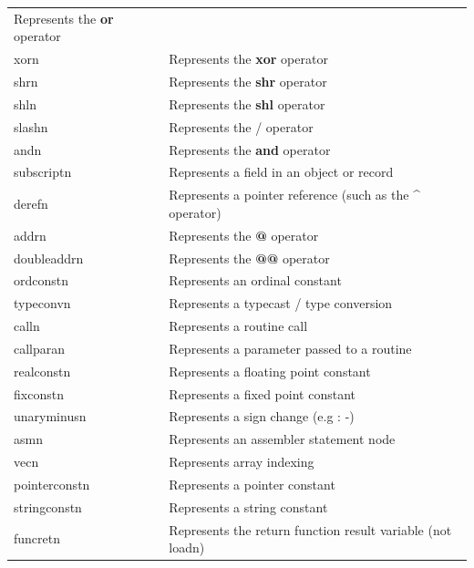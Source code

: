\documentclass [a4paper,12pt]{article}
\begin{document}
\begin{longtable}{|l|p{10cm}|}
        \textsf{Represents the }\textsf{\textbf{or}}\textsf{ operator} \\
\textsf{xorn}&
        \textsf{Represents the }\textsf{\textbf{xor}}\textsf{ operator} \\
\textsf{shrn}&
        \textsf{Represents the }\textsf{\textbf{shr}}\textsf{ operator} \\
\textsf{shln}&
        \textsf{Represents the }\textsf{\textbf{shl}}\textsf{ operator} \\
\textsf{slashn}&
        \textsf{Represents the / operator} \\
\textsf{andn}&
        \textsf{Represents the }\textsf{\textbf{and}}\textsf{ operator} \\
\textsf{subscriptn}&
        \textsf{Represents a field in an object or record} \\
\textsf{derefn}&
        \textsf{Represents a pointer reference (such as the }\textsf{\textbf{\^}}\textsf{ operator)} \\
\textsf{addrn}&
        \textsf{Represents the }\textsf{\textbf{@}}\textsf{ operator} \\
\textsf{doubleaddrn}&
        \textsf{Represents the }\textsf{\textbf{@@}}\textsf{ operator} \\
\textsf{ordconstn}&
        \textsf{Represents an ordinal constant} \\
\textsf{typeconvn}&
        \textsf{Represents a typecast / type conversion} \\
\textsf{calln}&
        \textsf{Represents a routine call} \\
\textsf{callparan}&
        \textsf{Represents a parameter passed to a routine} \\
\textsf{realconstn}&
        \textsf{Represents a floating point constant} \\
\textsf{fixconstn}&
        \textsf{Represents a fixed point constant} \\
\textsf{unaryminusn}&
        \textsf{Represents a sign change (e.g : -)} \\
\textsf{asmn}&
        \textsf{Represents an assembler statement node} \\
\textsf{vecn}&
        \textsf{Represents array indexing} \\
\textsf{pointerconstn}&
        \textsf{Represents a pointer constant} \\
\textsf{stringconstn}&
        \textsf{Represents a string constant} \\
\textsf{funcretn}&
        \textsf{Represents the return function result variable (not loadn)} \\

\end{longtable}
\end{document}
